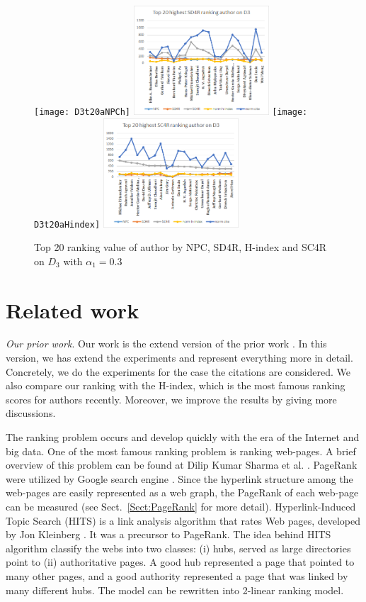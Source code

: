 \documentclass[10pt,leqno,twoside]{article}
\begin{document}
\begin{figure} %
	\caption{Top 20 ranking value of author by NPC, SD4R, H-index and SC4R on $D_3$ with $\alpha_1=0.3$}
	\label{Fig:Top20AuthorD3}
    \centering
    \texttt{[image: D3t20aNPCh]}
    \includegraphics[width=0.45\textwidth]{D3t20aSD4Rh}
     \texttt{[image: D3t20aHindex]}
     \includegraphics[width=0.45\textwidth]{D3t20aSC4Rh}
\end{figure}

\section{Related work}\label{Sect:Related}
\textit{Our prior work}. Our work is the extend version of the prior work \cite{Vu14}. In this version, we has extend the experiments and represent everything more in detail. Concretely, we do the experiments for the case the citations are considered. We also compare our ranking with the H-index, which is the most famous ranking scores for authors recently. Moreover, we improve the results by giving more discussions.

The ranking problem occurs and develop quickly with the era of the Internet and big data. One of the most famous ranking problem is ranking web-pages. A brief overview of this problem can be found at Dilip Kumar Sharma et al. \cite{RankOverview}. PageRank were utilized by Google search engine \cite{pagerank98}.
Since the hyperlink structure among the web-pages are easily represented as a web graph,
the PageRank of each web-page can be measured (see Sect.~\ref{Sect:PageRank} for more detail). Hyperlink-Induced Topic Search (HITS) is a link analysis algorithm that rates Web pages, developed by Jon Kleinberg \cite{HIndex}. It was a precursor to PageRank. The idea behind HITS algorithm classify the webs into two classes: (i) hubs, served as large directories point to (ii) authoritative pages. A good hub represented a page that pointed to many other pages, and a good authority represented a page that was linked by many different hubs. The model can be rewritten into 2-linear ranking model.
\end{document}
